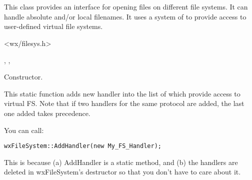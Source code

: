 %
%

\section{}\label{wxfilesystem}

This class provides an interface for opening files on different
file systems. It can handle absolute and/or local filenames.
It uses a system of  to
provide access to user-defined virtual file systems.




<wx/filesys.h>




, 
, 



\label{wxfilesystemwxfilesystem}


Constructor. 


\label{wxfilesystemaddhandler}


This static function adds new handler into the list of 
 which provide access to virtual FS.
Note that if two handlers for the same protocol are added, the last one added
takes precedence.


You can call:

\begin{verbatim}
wxFileSystem::AddHandler(new My_FS_Handler);
\end{verbatim}

This is because (a) AddHandler is a static method, and (b) the handlers
are deleted in wxFileSystem's destructor so that you don't have to
care about it.


\label{wxfilesystemhashandlerforpath}

